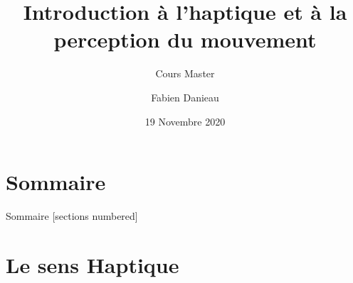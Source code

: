 \documentclass[compress, noflama]{beamer}
\title{Introduction à l'haptique et à la perception du mouvement}
\subtitle{Cours Master}
\date{19 Novembre 2020}%
\author{Fabien Danieau}
\institute{InterDigital - Immersive Media Lab\\ \href{mailto:fabien.danieau@interdigital.com}{fabien.danieau@interdigital.com}}
\begin{document}

\maketitle


\section*{Sommaire}
\begin{frame}{Sommaire}
	[sections numbered]
	\tableofcontents[hideallsubsections]
\end{frame}


\section{Le sens Haptique}
\end{document}
